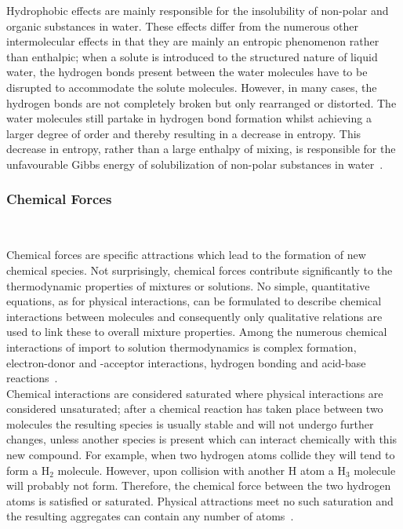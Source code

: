Hydrophobic effects are mainly responsible for the insolubility of non-polar and organic substances in water. These effects differ from the numerous other intermolecular effects in that they are mainly an entropic phenomenon rather than enthalpic; when a solute is introduced to the structured nature of liquid water, the hydrogen bonds present between the water molecules have to be disrupted to accommodate the solute molecules. However, in many cases, the hydrogen bonds are not completely broken but only rearranged or distorted. The water molecules still partake in hydrogen bond formation whilst achieving a larger degree of order and thereby resulting in a decrease in entropy.  This decrease in entropy, rather than a large enthalpy of mixing, is responsible for the unfavourable Gibbs energy of solubilization of non-polar substances in water~\cite{MolecularThermodynamicsOfFluidPhaseEquilibria}.\\

\subsubsection{Chemical Forces}\

Chemical forces are specific attractions which lead to the formation of new chemical species. Not surprisingly, chemical forces contribute significantly to the thermodynamic properties of mixtures or solutions. No simple, quantitative equations, as for physical interactions, can be formulated to describe chemical interactions between molecules and consequently only qualitative relations are used to link these to overall mixture properties. Among the numerous chemical interactions of import to solution thermodynamics is complex formation, electron-donor and -acceptor interactions, hydrogen bonding and acid-base reactions~\cite{MolecularThermodynamicsOfFluidPhaseEquilibria}.\\

Chemical interactions are considered saturated where physical interactions are considered unsaturated; after a chemical reaction has taken place between two molecules the resulting species is usually stable and will not undergo further changes, unless another species is present which can interact chemically with this new compound. For example, when two hydrogen atoms collide they will tend to form a $\mathrm{H_{2}}$ molecule. However, upon collision with another $\mathrm{H}$ atom a $\mathrm{H_{3}}$ molecule will probably not form. Therefore, the chemical force between the two hydrogen atoms is satisfied or saturated. Physical attractions meet no such saturation and the resulting aggregates can contain any number of atoms~\cite{MolecularThermodynamicsOfFluidPhaseEquilibria}.\\

